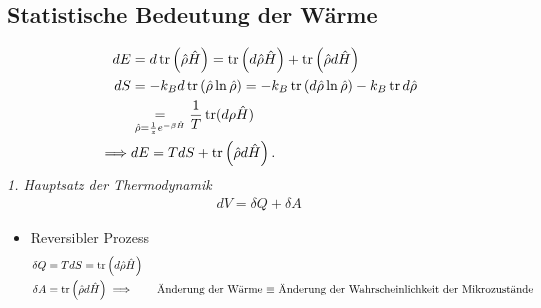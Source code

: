 \subsection*{Statistische Bedeutung der W\"arme}
%
\begin{align*}
  dE & = d \operatorname{tr} \left( \hat{\rho} \hat{H} \right) = 
  \operatorname{tr}\left( d \hat{\rho} \hat{H} \right) + 
  \operatorname{tr} \left( \hat{\rho} d \hat{H} \right)  \\
  dS & = -k_B d \operatorname{tr} \left( \hat{\rho} \ln{ \hat{\rho}} \right) = 
  - k_B \operatorname{tr} \left( d \hat{\rho} \ln{ \hat{\rho}} \right) - k_B \operatorname{tr} d \hat{\rho} \\
   & \underset{\hat{\rho} = \frac{1}{z } e^{- \beta \hat{ H}}}{=} 
  \frac{1}{T} \operatorname{tr} (d\rho \hat{H}) \\
\implies & dE = T dS + \operatorname{tr} \left( \hat{\rho} d \hat{H} \right).
\end{align*}
\emph{1. Hauptsatz der Thermodynamik} 
%
\begin{align*}
  dV = \delta Q + \delta A
\end{align*}
%
\begin{itemize}
  \item Reversibler Prozess
    \begin{align*}
      \delta Q & = T dS = \operatorname{tr} \left( d \hat{\rho} \hat{H} \right) \\
      \delta A & = \operatorname{tr} \left( \hat{\rho} d \hat{H} \right)
      \implies & \text{ \"Anderung der W\"arme $\equiv$ 
    \"Anderung der Wahrscheinlichkeit der Mikrozust\"ande}
    \end{align*}
\end{itemize}
